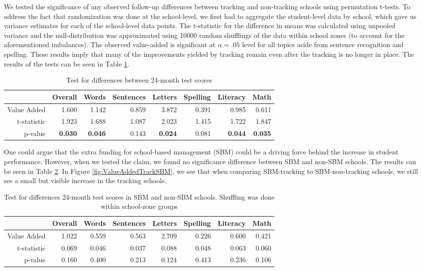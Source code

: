 \documentclass[11pt]{article}
\begin{document}
We tested the significance of any observed follow-up differences between tracking and non-tracking schools using permutation t-tests. To address the fact that randomization was done at the school-level, we first had to aggregate the student-level data by school, which gave us variance estimates for each of the school-level data points.  The t-statistic for the difference in means was calculated using unpooled variance and the null-distribution was approximated using 10000 random shufflings of the data within school zones (to account for the aforementioned imbalances).  The observed value-added is significant at $ \alpha = .05 $ level for all topics aside from sentence recognition and spelling. These results imply that many of the improvements yielded by tracking remain even after the tracking is no longer in place. The results of the tests can be seen in Table \ref{tab:tracking_va}.

\begin{table}[ht]
	\centering
	\begin{tabular}{rrrrrrrr}
		\hline
		& Overall & Words & Sentences & Letters & Spelling & Literacy & Math \\ 
		\hline
		Value Added & 1.600 & 1.142 & 0.859 & 3.872 & 0.391 & 0.985 & 0.611 \\ 
		t-statistic & 1.923 & 1.688 & 1.087 & 2.023 & 1.415 & 1.722 & 1.847 \\ 
		p-value & {\bf 0.030} & {\bf 0.046} & 0.143 & {\bf 0.024} & 0.081 & {\bf 0.044} & {\bf 0.035 }\\ 
		\hline
	\end{tabular}
	\caption{Test for differences between 24-month test scores} 
		\label{tab:tracking_va}
\end{table}

One could argue that the extra funding for school-based management (SBM) could be a driving force behind the increase in student performance.  However, when we tested the claim, we found no significance difference between SBM and non-SBM schools.  The results can be seen in Table \ref{tab:sbm}.  In Figure \ref{fig:ValueAddedTrackSBM}, we see that when comparing SBM-tracking to SBM-non-tracking schools, we still see a small but visible increase in the tracking schools.

\begin{table}[ht]
	\centering
	\begin{tabular}{rrrrrrrr}
		\hline
		& Overall & Words & Sentences & Letters & Spelling & Literacy & Math \\ 
		\hline
		Value Added & 1.022 & 0.559 & 0.563 & 2.709 & 0.226 & 0.600 & 0.421 \\ 
		t-statistic & 0.069 & 0.046 & 0.037 & 0.088 & 0.048 & 0.063 & 0.060 \\ 
		p-value & 0.160 & 0.400 & 0.213 & 0.124 & 0.413 & 0.236 & 0.106 \\ 
		\hline
	\end{tabular}
	\caption{Test for differences 24-month test scores in SBM and non-SBM schools.  
		Shuffling was done within school-zone groups} 
	\label{tab:sbm}
\end{table}
\end{document}
